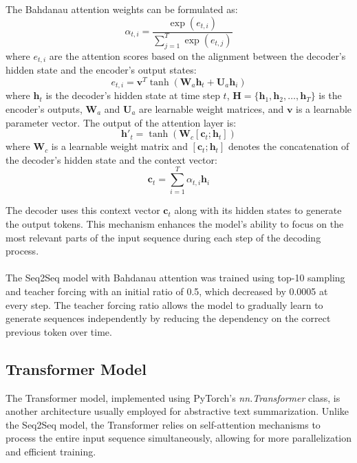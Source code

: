 \documentclass[a4paper, 11pt]{article}
\begin{document}
The Bahdanau attention weights can be formulated as:
\begin{equation}
    \alpha_{t,i} = \frac{\exp(e_{t,i})}{\sum_{j=1}^{T} \exp(e_{t,j})}
\end{equation}
where \( e_{t,i}\) are the attention scores based on the alignment between the decoder's hidden state and the encoder's output states:
\begin{equation}
    e_{t,i} = \mathbf{v}^T \tanh(\mathbf{W}_a \mathbf{h}_t + \mathbf{U}_a \mathbf{h}_i)
\end{equation}
where \( \mathbf{h}_t \) is the decoder's hidden state at time step \( t \), \( \mathbf{H} = \{\mathbf{h}_1, \mathbf{h}_2, \ldots, \mathbf{h}_T\} \) is the encoder's outputs, \( \mathbf{W}_a \) and \( \mathbf{U}_a \) are learnable weight matrices, and \( \mathbf{v} \) is a learnable parameter vector.
The output of the attention layer is:
\begin{equation}
    \mathbf{h}'_t = \tanh(\mathbf{W}_c [\mathbf{c}_t ; \mathbf{h}_t])
\end{equation}
where \( \mathbf{W}_c \) is a learnable weight matrix and \( [\mathbf{c}_t ; \mathbf{h}_t] \) denotes the concatenation of the decoder's hidden state and the context vector:
\begin{equation}
    \mathbf{c}_t = \sum_{i=1}^{T} \alpha_{t,i} \mathbf{h}_i
\end{equation}

The decoder uses this context vector \( \mathbf{c}_t \) along with its hidden states to generate the output tokens. This mechanism enhances the model's ability to focus on the most relevant parts of the input sequence during each step of the decoding process.

\paragraph{}
The Seq2Seq model with Bahdanau attention was trained using top-10 sampling and teacher forcing with an initial ratio of 0.5, which decreased by 0.0005 at every step. The teacher forcing ratio allows the model to gradually learn to generate sequences independently by reducing the dependency on the correct previous token over time.

\subsection{Transformer Model}

The Transformer model\cite{vaswani2017attention}, implemented using PyTorch's \textit{nn.Transformer} class\cite{transformer}, is another architecture usually employed for abstractive text summarization. Unlike the Seq2Seq model, the Transformer relies on self-attention mechanisms to process the entire input sequence simultaneously, allowing for more parallelization and efficient training.
\end{document}
